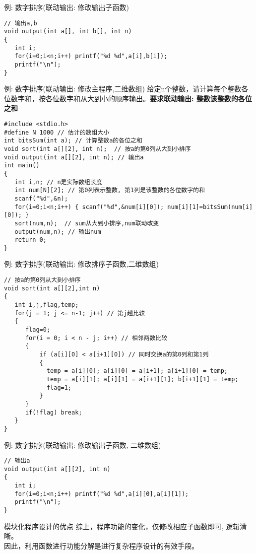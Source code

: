 \begin{frame}{例: 数字排序(联动输出: 修改输出子函数)}
\begin{lstlisting}
// 输出a,b
void output(int a[], int b[], int n)
{
   int i;
   for(i=0;i<n;i++) printf("%d %d",a[i],b[i]);
   printf("\n");
}
\end{lstlisting}
\end{frame}

\begin{frame}{例: 数字排序(联动输出: 修改主程序,二维数组)}
给定n个整数，请计算每个整数各位数字和，按各位数字和从大到小的顺序输出。\textbf{要求联动输出: 整数\quad 该整数的各位之和}
\begin{lstlisting}
#include <stdio.h>
#define N 1000 // 估计的数组大小
int bitsSum(int a); // 计算整数a的各位之和
void sort(int a[][2], int n);  // 按a的第0列从大到小排序
void output(int a[][2], int n); // 输出a
int main()
{
   int i,n; // n是实际数组长度 
   int num[N][2]; // 第0列表示整数, 第1列是该整数的各位数字的和  
   scanf("%d",&n);
   for(i=0;i<n;i++) { scanf("%d",&num[i][0]); num[i][1]=bitsSum(num[i][0]); }
   sort(num,n);  // sum从大到小排序,num联动改变
   output(num,n); // 输出num
   return 0;
}
\end{lstlisting}
\end{frame}

\begin{frame}{例: 数字排序(联动输出: 修改排序子函数,二维数组)}
\begin{lstlisting}
// 按a的第0列从大到小排序
void sort(int a[][2],int n)
{
   int i,j,flag,temp;
   for(j = 1; j <= n-1; j++) // 第j趟比较
   {
      flag=0;
      for(i = 0; i < n - j; i++) // 相邻两数比较
      {
          if (a[i][0] < a[i+1][0]) // 同时交换a的第0列和第1列
          { 
            temp = a[i][0]; a[i][0] = a[i+1]; a[i+1][0] = temp; 
            temp = a[i][1]; a[i][1] = a[i+1][1]; b[i+1][1] = temp; 
            flag=1;
          }
      }
      if(!flag) break;
   }
}
\end{lstlisting}
\end{frame}

\begin{frame}{例: 数字排序(联动输出: 修改输出子函数, 二维数组)}
\begin{lstlisting}
// 输出a
void output(int a[][2], int n)
{
   int i;
   for(i=0;i<n;i++) printf("%d %d",a[i][0],a[i][1]);
   printf("\n");
}
\end{lstlisting}

\begin{block}{模块化程序设计的优点}
	综上，程序功能的变化，仅修改相应子函数即可, 逻辑清晰。\\
	因此，利用函数进行功能分解是进行复杂程序设计的有效手段。
\end{block}
\end{frame}






